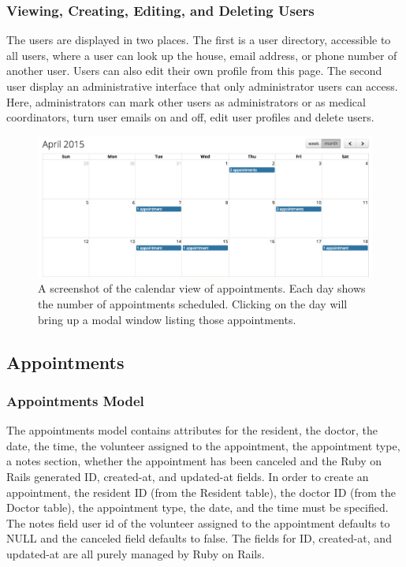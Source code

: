 \documentclass{sig-alternate}
\begin{document}
\subsubsection{Viewing, Creating, Editing, and Deleting Users}
The users are displayed in two places. The first is a user directory, accessible to all users, where a user can look up the house, email address, or phone number of another user. Users can also edit their own profile from this page. The second user display an administrative interface that only administrator users can access. Here, administrators can mark other users as administrators or as medical coordinators, turn user emails on and off, edit user profiles and delete users.

\begin{figure}
\includegraphics[scale=0.4]{Calendar}
\caption{A screenshot of the calendar view of appointments.  Each day shows the number of appointments scheduled.  Clicking on the day will bring up a modal window listing those appointments.}
\end{figure}

\subsection{Appointments}

\subsubsection{Appointments Model}
The appointments model contains attributes for the resident, the doctor, the date, the time, the volunteer assigned to the appointment, the appointment type, a notes section, whether the appointment has been canceled and the Ruby on Rails generated ID, created-at, and updated-at fields.  In order to create an appointment, the resident ID (from the Resident table), the doctor ID (from the Doctor table), the appointment type, the date, and the time must be specified.  The notes field user id of the volunteer assigned to the appointment defaults to NULL and the canceled field defaults to false.  The fields for ID, created-at, and updated-at are all purely managed by Ruby on Rails. 
\end{document}
